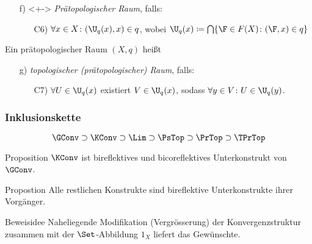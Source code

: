 \begin{frame}
\begin{enumerate}[a)]
\begin{enumerate}
      \end{enumerate}
    \item[f)]<+-> \emph{Prätopologischer Raum}, falls:
      \begin{enumerate}
        \item[C6)] $\forall x \in X \colon (\U_q(x), x) \in q$, wobei $\U_q(x) \coloneqq \bigcap\{ \F \in F(X) \colon (\F, x) \in q\}$
      \end{enumerate}
  \end{enumerate}
  \pause
  Ein prätopologischer Raum $(X,q)$ heißt 
  \begin{enumerate}[a)]
    \item[g)] \emph{topologischer (pr\"atopologischer) Raum}, falls:
      \begin{enumerate}
        \item[C7)] $\forall U \in \U_q(x)$ existiert $V \in \U_q(x)$, sodass $\forall y \in V \colon U \in \U_q(y)$.
      \end{enumerate}
  \end{enumerate}
\end{frame}

\begin{frame}
  \frametitle{Inklusionskette}
  $$
  \GConv \supset \KConv \supset \Lim \supset \PsTop \supset \PrTop \supset \TPrTop
  $$

  \begin{block}{Proposition}
    $\KConv$ ist bireflektives und bicoreflektives Unterkonstrukt von $\GConv$.
  \end{block}

  \begin{block}{Propostion}
    Alle restlichen Konstrukte sind bireflektive Unterkonstrukte ihrer Vorg\"anger.
  \end{block}

  \begin{block}{Beweisidee}
    Naheliegende Modifikation (Vergr\"osserung) der Konvergenzstruktur zusammen mit der $\Set$-Abbildung $1_X$ liefert das Gew\"unschte.
  \end{block}
\end{frame}

